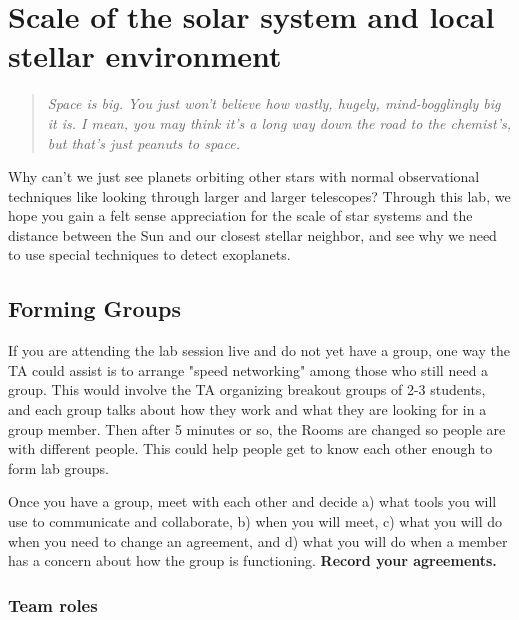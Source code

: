 \chapter{Scale of the solar system and local stellar environment}

\begin{quotation}
	\textit{Space is big. You just won't believe how vastly, hugely, mind-bogglingly big it is. I mean, you may think it's a long way down the road to the chemist's, but that's just peanuts to space.} 
\end{quotation}

Why can't we just see planets orbiting other stars with normal observational techniques like looking through larger and larger telescopes? Through this lab, we hope you gain a felt sense appreciation for the scale of star systems and the distance between the Sun and our closest stellar neighbor, and see why we need to use special techniques to detect exoplanets.

\section{Forming Groups}

If you are attending the lab session live and do not yet have a group, one way the TA could assist is to arrange "speed networking" among those who still need a group. This would involve the TA organizing breakout groups of 2-3 students, and each group talks about how they work and what they are looking for in a group member. Then after 5 minutes or so, the Rooms are changed so people are with different people. This could help people get to know each other enough to form lab groups.

\begin{steps}
	\item Once you have a group, meet with each other and decide a) what tools you will use to communicate and collaborate, b) when you will meet, c) what you will do when you need to change an agreement, and d) what you will do when a member has a concern about how the group is functioning. \textbf{Record your agreements.}%
\end{steps}

\subsection{Team roles}

